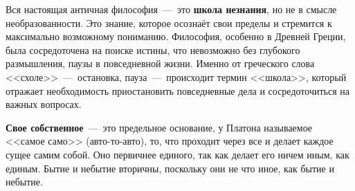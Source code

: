 Вся настоящая античная философия~---~это \textbf{школа незнания}, но не в смысле необразованности. Это знание, которое осознаёт свои пределы и стремится к максимально возможному пониманию. Философия, особенно в Древней Греции, была сосредоточена на поиске истины, что невозможно без глубокого размышления, паузы в повседневной жизни. Именно от греческого слова <<схоле>>~---~остановка, пауза~---~происходит термин <<школа>>, который отражает необходимость приостановить повседневные дела и сосредоточиться на важных вопросах.


\textbf{Свое собственное}~---~это предельное основание, у Платона называемое <<самое само>> (авто-то-авто), то, что проходит через все и делает каждое сущее самим собой. Оно первичнее единого, так как делает его ничем иным, как единым. Бытие и небытие вторичны, поскольку они не что иное, как бытие и небытие.




